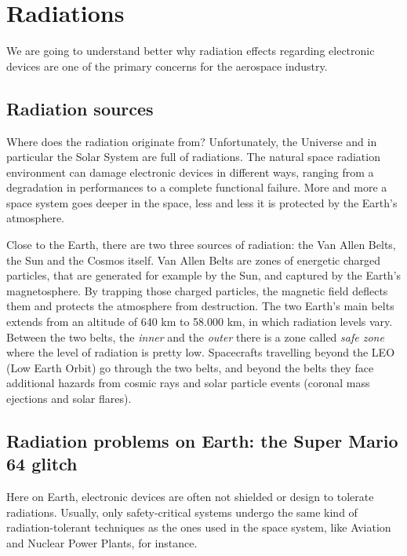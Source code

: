 \section{Radiations}

We are going to understand better why radiation effects regarding electronic devices are one of the primary concerns for the aerospace industry.\bigskip

\subsection{Radiation sources}
Where does the radiation originate from? Unfortunately, the Universe and in particular the Solar System are full of radiations. The natural space radiation environment can damage electronic devices in different ways, ranging from a degradation in performances to a complete functional failure. More and more a space system goes deeper in the space, less and less it is protected by the Earth's atmosphere.\bigskip

Close to the Earth, there are two three sources of radiation: the Van Allen Belts, the Sun and the Cosmos itself. Van Allen Belts are zones of energetic charged particles, that are generated for example by the Sun, and captured by the Earth's magnetosphere. By trapping those charged particles, the magnetic field deflects them and protects the atmosphere from destruction. The two Earth's main belts extends from an altitude of 640 km to 58.000 km, in which radiation levels vary. Between the two belts, the \textit{inner} and the \textit{outer} there is a zone called \textit{safe zone} where the level of radiation is pretty low. Spacecrafts travelling beyond the LEO (Low Earth Orbit) go through the two belts, and beyond the belts they face additional hazards from cosmic rays and solar particle events (coronal mass ejections and solar flares).


\subsection{Radiation problems on Earth: the Super Mario 64 glitch}

Here on Earth, electronic devices are often not shielded or design to tolerate radiations. Usually, only safety-critical systems undergo the same kind of radiation-tolerant techniques as the ones used in the space system, like Aviation and Nuclear Power Plants, for instance.\bigskip

